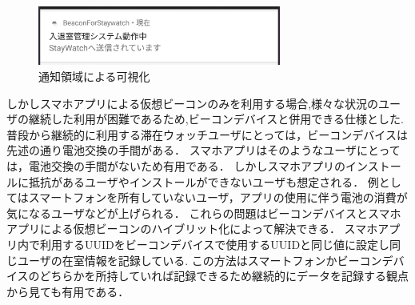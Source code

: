 \begin{figure}[tbh]
  \centering
  \includegraphics[width=8cm]{image/notify.jpg}
  \caption{通知領域による可視化}
  \label{multipleBPM}
\end{figure}
 しかしスマホアプリによる仮想ビーコンのみを利用する場合,様々な状況のユーザの継続した利用が困難であるため,ビーコンデバイスと併用できる仕様とした.
 普段から継続的に利用する滞在ウォッチユーザにとっては，ビーコンデバイスは先述の通り電池交換の手間がある．
スマホアプリはそのようなユーザにとっては，電池交換の手間がないため有用である．
 しかしスマホアプリのインストールに抵抗があるユーザやインストールができないユーザも想定される．
例としてはスマートフォンを所有していないユーザ，アプリの使用に伴う電池の消費が気になるユーザなどが上げられる．
 これらの問題はビーコンデバイスとスマホアプリによる仮想ビーコンのハイブリット化によって解決できる．
スマホアプリ内で利用するUUIDをビーコンデバイスで使用するUUIDと同じ値に設定し同じユーザの在室情報を記録している.
この方法はスマートフォンかビーコンデバイスのどちらかを所持していれば記録できるため継続的にデータを記録する観点から見ても有用である．

